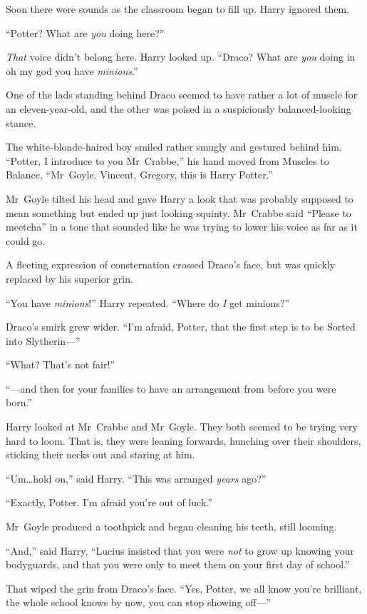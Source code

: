 Soon there were sounds as the classroom began to fill up. Harry ignored them.

“Potter? What are \emph{you} doing here?”

\emph{That} voice didn’t belong here. Harry looked up. “Draco? What are \emph{you} doing in oh my god you have \emph{minions}.”

One of the lads standing behind Draco seemed to have rather a lot of muscle for an eleven-year-old, and the other was poised in a suspiciously balanced-looking stance.

The white-blonde-haired boy smiled rather smugly and gestured behind him. “Potter, I introduce to you Mr~Crabbe,” his hand moved from Muscles to Balance, “Mr~Goyle. Vincent, Gregory, this is Harry Potter.”

Mr~Goyle tilted his head and gave Harry a look that was probably supposed to mean something but ended up just looking squinty. Mr~Crabbe said “Please to meetcha” in a tone that sounded like he was trying to lower his voice as far as it could go.

A fleeting expression of consternation crossed Draco’s face, but was quickly replaced by his superior grin.

“You have \emph{minions}!” Harry repeated. “Where do \emph{I} get minions?”

Draco’s smirk grew wider. “I’m afraid, Potter, that the first step is to be Sorted into Slytherin—”

“What? That’s not fair!”

“—and then for your families to have an arrangement from before you were born.”

Harry looked at Mr~Crabbe and Mr~Goyle. They both seemed to be trying very hard to loom. That is, they were leaning forwards, hunching over their shoulders, sticking their necks out and staring at him.

“Um…hold on,” said Harry. “This was arranged \emph{years} ago?”

“Exactly, Potter. I’m afraid you’re out of luck.”

Mr~Goyle produced a toothpick and began cleaning his teeth, still looming.

“And,” said Harry, “Lucius insisted that you were \emph{not} to grow up knowing your bodyguards, and that you were only to meet them on your first day of school.”

That wiped the grin from Draco’s face. “Yes, Potter, we all know you’re brilliant, the whole school knows by now, you can stop showing off—”

